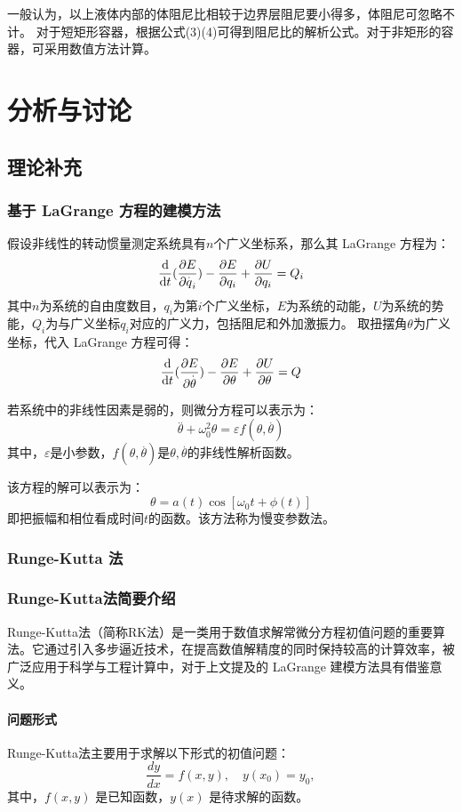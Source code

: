 \documentclass[12pt,hyperref,a4paper,UTF8]{ctexart}
\begin{document}
\begin{itemize}
        一般认为，以上液体内部的体阻尼比相较于边界层阻尼要小得多，体阻尼可忽略不计。  
        对于短矩形容器，根据公式(3)(4)可得到阻尼比的解析公式。对于非矩形的容器，可采用数值方法计算。

\section{分析与讨论}

\subsection{理论补充}
\subsubsection{基于 LaGrange 方程的建模方法}
假设非线性的转动惯量测定系统具有$n$个广义坐标系，那么其 LaGrange 方程为：
$$ \frac{\text d}{\text dt}(\frac{\partial E}{\partial\overset{.}q_i})-\frac{\partial E}{\partial q_i}+\frac{\partial U}{\partial q_i}=Q_i $$
其中$n$为系统的自由度数目，$q_i$为第$i$个广义坐标，$E$为系统的动能，$U$为系统的势能，$Q_i$为与广义坐标$q_i$对应的广义力，包括阻尼和外加激振力。
取扭摆角$\theta$为广义坐标，代入 LaGrange 方程可得：
$$ \frac{\text d}{\text dt}(\frac{\partial E}{\partial\overset{.}\theta})-\frac{\partial E}{\partial \theta}+\frac{\partial U}{\partial \theta}=Q $$

若系统中的非线性因素是弱的，则微分方程可以表示为：
$$ \overset{..}\theta+\omega_0^2\theta=\varepsilon f(\theta,\overset{.}\theta) $$
其中，$\varepsilon$是小参数，$f(\theta,\overset{.}\theta)$是$\theta,\overset{.}\theta$的非线性解析函数。

该方程的解可以表示为：
$$ \theta=a(t)\cos[\omega_0t+\phi(t)] $$
即把振幅和相位看成时间$t$的函数。该方法称为慢变参数法。
\subsubsection{Runge-Kutta 法}
\subsubsection*{Runge-Kutta法简要介绍}

Runge-Kutta法（简称RK法）是一类用于数值求解常微分方程初值问题的重要算法。它通过引入多步逼近技术，在提高数值解精度的同时保持较高的计算效率，被广泛应用于科学与工程计算中，对于上文提及的 LaGrange 建模方法具有借鉴意义。

\paragraph{问题形式}
Runge-Kutta法主要用于求解以下形式的初值问题：
\[
\frac{dy}{dx} = f(x, y), \quad y(x_0) = y_0,
\]
其中，\( f(x, y) \) 是已知函数，\( y(x) \) 是待求解的函数。


\end{itemize}
\end{document}
